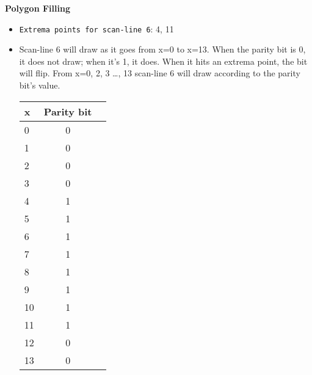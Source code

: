 \documentclass[12pt]{article}
\begin{document}
\begin{enumerate}
\textbf{Polygon Filling} \\

\begin{itemize}

\item



\texttt{Extrema points for scan-line 6}: 4, 11


\item

Scan-line 6 will draw as it goes from x=0 to x=13. When the parity bit is 0, it does not draw; when it's 1, it does. When it hits an extrema point, the bit will flip. From x=0, 2, 3 \ldots , 13 scan-line 6 will draw according to the parity bit's value. \\

\begin{tabular}{ l | cr }
  x & Parity bit \\ \hline
  0 & 0  \\
  1 & 0  \\
  2 & 0  \\
  3 & 0  \\
  4 & 1  \\
  5 & 1  \\
  6 & 1  \\
  7 & 1  \\
  8 & 1  \\
  9 & 1  \\
  10 & 1  \\
  11 & 1  \\
  12 & 0  \\
  13 & 0  \\
\end{tabular}


\end{itemize}



\end{enumerate}
\end{document}
